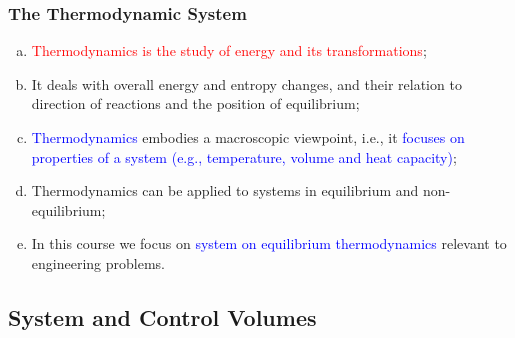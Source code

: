 \documentclass[10pt,compress]{beamer}
\newcommand{\red}{\textcolor{red}}
\newcommand{\blue}{\textcolor{blue}}
\begin{document}
\begin{frame}
 \frametitle{The Thermodynamic System}
  \begin{enumerate}[(a)]\scriptsize
   \item <1-> \red{Thermodynamics is the study of energy and its transformations};
   \item <2-> It deals with overall energy and entropy changes, and their relation to direction of reactions and the position of equilibrium;
   \item <3-> \blue{Thermodynamics} embodies a macroscopic viewpoint, i.e., it \blue{focuses on properties of a system (e.g., temperature, volume and heat capacity)};
   \item <4-> Thermodynamics can be applied to systems in equilibrium and non-equilibrium;
   \item <5-> In this course we focus on \blue{system on equilibrium thermodynamics} relevant to engineering problems.     
  \end{enumerate}
\end{frame}

\subsection{System and Control Volumes} 
\end{document}
